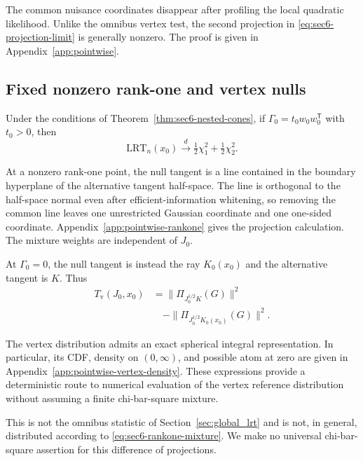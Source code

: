 The common nuisance coordinates disappear after profiling
the local quadratic likelihood. Unlike the omnibus vertex
test, the second projection in
\eqref{eq:sec6-projection-limit} is generally nonzero.
The proof is given in Appendix~\ref{app:pointwise}.

\subsection{Fixed nonzero rank-one and vertex nulls}
\label{subsec:pointwise_fixed_limits}

\begin{proposition}\label{prop:sec6-rankone-lrt}
Under the conditions of
Theorem~\ref{thm:sec6-nested-cones}, if
$\Gamma_0=t_0w_0w_0^{\mathsf T}$ with $t_0>0$, then
\begin{equation}\label{eq:sec6-rankone-mixture}
\mathrm{LRT}_n(x_0)\xrightarrow{d}
\tfrac12\chi_1^2+\tfrac12\chi_2^2.
\end{equation}
\end{proposition}

At a nonzero rank-one point, the null tangent is a line
contained in the boundary hyperplane of the alternative
tangent half-space. The line is orthogonal to the half-space
normal even after efficient-information whitening, so
removing the common line leaves one unrestricted Gaussian
coordinate and one one-sided coordinate. Appendix~\ref{app:pointwise-rankone} gives
the projection calculation. The mixture weights are
independent of $J_0$.

At $\Gamma_0=0$, the null tangent is instead the ray
$K_0(x_0)$ and the alternative tangent is $K$. Thus
\begin{equation}\label{eq:sec6-vertex-limit}
\begin{aligned}
T_{\mathrm v}(J_0,x_0)
&=\|\Pi_{J_0^{1/2}K}(G)\|^2\\
&\quad-
\|\Pi_{J_0^{1/2}K_0(x_0)}(G)\|^2.
\end{aligned}
\end{equation}

The vertex distribution admits an exact spherical
integral representation. In particular, its CDF,
density on $(0,\infty)$, and possible atom at zero
are given in Appendix~\ref{app:pointwise-vertex-density}.
These expressions provide a deterministic route
to numerical evaluation of the vertex reference
distribution without assuming a finite
chi-bar-square mixture.

This is not the omnibus statistic of
Section~\ref{sec:global_lrt} and is
not, in general, distributed according to
\eqref{eq:sec6-rankone-mixture}. We make no universal
chi-bar-square assertion for this difference of projections.

